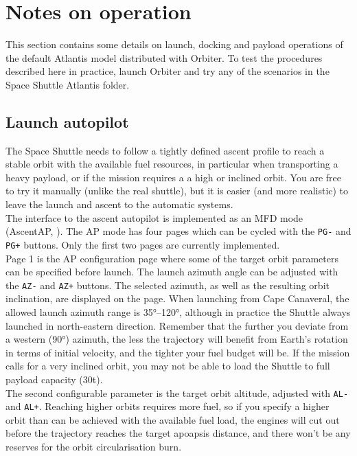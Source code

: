 \section{Notes on operation}
This section contains some details on launch, docking and payload operations of the default Atlantis model distributed with Orbiter. To test the procedures described here in practice, launch Orbiter and try any of the scenarios in the Space Shuttle Atlantis folder.

\subsection{Launch autopilot}
The Space Shuttle needs to follow a tightly defined ascent profile to reach a stable orbit with the available fuel resources, in particular when transporting a heavy payload, or if the mission requires a a high or inclined orbit. You are free to try it manually (unlike the real shuttle), but it is easier (and more realistic) to leave the launch and ascent to the automatic systems.\\

The interface to the ascent autopilot is implemented as an MFD mode (AscentAP, ). The AP mode has four pages which can be cycled with the 
\texttt{PG-} and \texttt{PG+} buttons. Only the first two pages are currently implemented.\\

Page 1 is the AP configuration page where some of the target orbit parameters can be specified before launch. The launch azimuth angle can be adjusted with the \texttt{AZ-} and \texttt{AZ+} buttons. The selected azimuth, as well as the resulting orbit inclination, are displayed on the page. When launching from Cape Canaveral, the allowed launch azimuth range is 35°–120°, although in practice the Shuttle always launched in north-eastern direction. Remember that the further you deviate from a western (90°) azimuth, the less the trajectory will benefit from Earth’s rotation in terms of initial velocity, and the tighter your fuel budget will be. If the mission calls for a very inclined orbit, you may not be able to load the Shuttle to full payload capacity (30t).\\

The second configurable parameter is the target orbit altitude, adjusted with \texttt{AL-} and \texttt{AL+}. Reaching higher orbits requires more fuel, so if you specify a higher orbit than can be achieved with the available fuel load, the engines will cut out before the trajectory reaches the target apoapsis distance, and there won’t be any reserves for the orbit circularisation burn.\\

